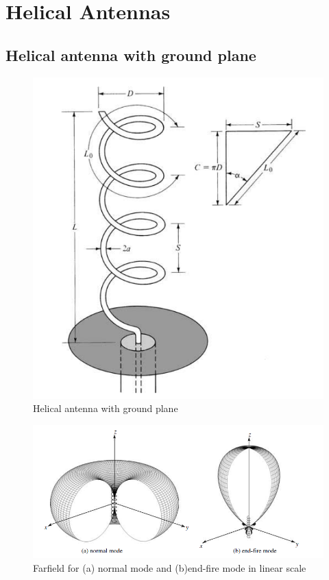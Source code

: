 \section{Helical Antennas}
\subsection{Helical antenna with ground plane}

\begin{figure}[H]
\centering 
\includegraphics[scale = 0.5]{figures/antennas/helical/helical}
\caption{Helical antenna with ground plane \citep{Balanis2005}}
\label{fig:helical}
\end{figure}

\begin{figure}[H]
\centering 
\includegraphics[scale = 0.5]{figures/antennas/helical/modes}
\caption{Farfield for (a) normal mode and (b)end-fire mode in linear scale \citep{Balanis2005}}
\label{fig:helical_modes}
\end{figure}

